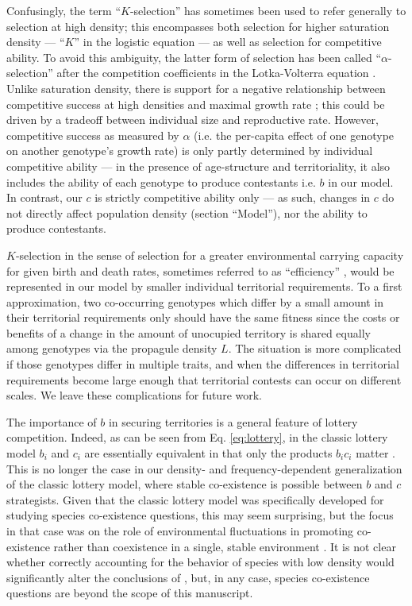\documentclass[11pt]{article}
\begin{document}
Confusingly, the term ``$K$-selection'' has sometimes been used to refer generally to selection at high density; this encompasses both selection for higher saturation density --- ``$K$'' in the logistic equation --- as well as selection for competitive ability. To avoid this ambiguity, the latter form of selection has been called ``$\alpha$-selection'' after the competition coefficients in the Lotka-Volterra equation \citep{gill_1974,case_1974,joshi_2001}. Unlike saturation density, there is support for a negative relationship between competitive success at high densities and maximal growth rate \citep{luckinbill_1979}; this could be driven by a tradeoff between individual size and reproductive rate. However, competitive success as measured by $\alpha$ (i.e. the per-capita effect of one genotype on another genotype's growth rate) is only partly determined by individual competitive ability --- in the presence of age-structure and territoriality, it also includes the ability of each genotype to produce contestants i.e. $b$ in our model. In contrast, our $c$ is strictly competitive ability only --- as such, changes in $c$ do not directly affect population density (section ``Model''), nor the ability to produce contestants.

$K$-selection in the sense of selection for a greater environmental carrying capacity for given birth and death rates, sometimes referred to as ``efficiency'' \citep{macarthur_1962}, would be represented in our model by smaller individual territorial requirements. To a first approximation, two co-occurring genotypes which differ by a small amount in their territorial requirements only should have the same fitness since the costs or benefits of a change in the amount of unocupied territory is shared equally among genotypes via the propagule density $L$. The situation is more complicated if those genotypes differ in multiple traits, and when the differences in territorial requirements become large enough that territorial contests can occur on different scales. We leave these complications for future work. 

The importance of $b$ in securing territories is a general feature of lottery competition. Indeed, as can be seen from Eq. \eqref{eq:lottery}, in the classic lottery model $b_i$ and $c_i$ are essentially equivalent in that only the products $b_i c_i$ matter \citep{chesson_1981}. This is no longer the case in our density- and frequency-dependent generalization of the classic lottery model, where stable co-existence is possible between $b$ and $c$ strategists. Given that the classic lottery model was specifically developed for studying species co-existence questions, this may seem surprising, but the focus in that case was on the role of environmental fluctuations in promoting co-existence rather than coexistence in a single, stable environment \citep{chesson_1981}. It is not clear whether correctly accounting for the behavior of species with low density would significantly alter the conclusions of \cite{chesson_1981}, but, in any case, species co-existence questions are beyond the scope of this manuscript. 
\end{document}

